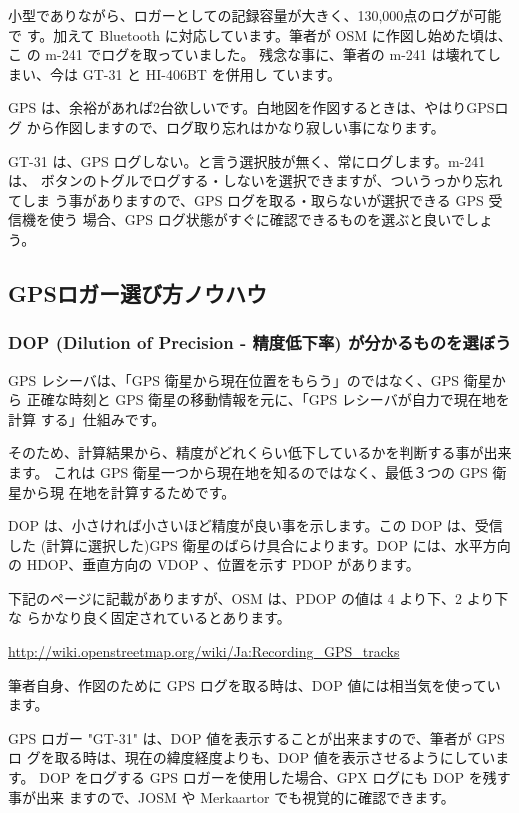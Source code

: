 \documentclass[mingoth,a4paper]{jsarticle}
\begin{document}
小型でありながら、ロガーとしての記録容量が大きく、130,000点のログが可能で
す。加えて Bluetooth に対応しています。筆者が OSM に作図し始めた頃は、こ
の m-241 でログを取っていました。
残念な事に、筆者の m-241 は壊れてしまい、今は GT-31 と HI-406BT を併用し
ています。

GPS は、余裕があれば2台欲しいです。白地図を作図するときは、やはりGPSログ
から作図しますので、ログ取り忘れはかなり寂しい事になります。

GT-31 は、GPS ログしない。と言う選択肢が無く、常にログします。m-241 は、
ボタンのトグルでログする・しないを選択できますが、ついうっかり忘れてしま
う事がありますので、GPS ログを取る・取らないが選択できる GPS 受信機を使う
場合、GPS ログ状態がすぐに確認できるものを選ぶと良いでしょう。

\subsection{GPSロガー選び方ノウハウ}

\subsubsection{DOP (Dilution of Precision - 精度低下率) が分かるものを選ぼう}

GPS レシーバは、「GPS 衛星から現在位置をもらう」のではなく、GPS 衛星から
正確な時刻と GPS 衛星の移動情報を元に、「GPS レシーバが自力で現在地を計算
する」仕組みです。

そのため、計算結果から、精度がどれくらい低下しているかを判断する事が出来ます。
これは GPS 衛星一つから現在地を知るのではなく、最低３つの GPS 衛星から現
在地を計算するためです。

DOP は、小さければ小さいほど精度が良い事を示します。この DOP は、受信した
(計算に選択した)GPS 衛星のばらけ具合によります。DOP には、水平方向の
HDOP、垂直方向の VDOP 、位置を示す PDOP があります。

下記のページに記載がありますが、OSM は、PDOP の値は 4 より下、2 より下な
らかなり良く固定されているとあります。

\url{http://wiki.openstreetmap.org/wiki/Ja:Recording_GPS_tracks}

筆者自身、作図のために GPS ログを取る時は、DOP 値には相当気を使っています。

GPS ロガー "GT-31" は、DOP 値を表示することが出来ますので、筆者が GPS ロ
グを取る時は、現在の緯度経度よりも、DOP 値を表示させるようにしています。
DOP をログする GPS ロガーを使用した場合、GPX ログにも DOP を残す事が出来
ますので、JOSM や Merkaartor でも視覚的に確認できます。
\end{document}
